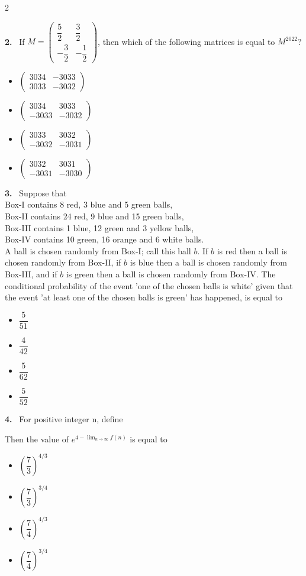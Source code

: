 \documentclass[10pt]{extarticle}
\newcommand{\qn}[1]{\par\smallskip\noindent\textbf{#1.}~}
\newenvironment{qoptions}{\begin{itemize}[leftmargin=1.8em,itemsep=1pt,topsep=2pt,label={}]}{\end{itemize}}
\newcommand{\opt}[2]{\item[(#1)] #2}
\begin{document}
\begin{multicols}{2}
\qn{2} If $M = \begin{pmatrix}\dfrac52 & \dfrac32\\ -\dfrac32 & -\dfrac12\end{pmatrix}$, then which of the following matrices is equal to $M^{2022}$?
\begin{qoptions}
\opt{A}{$\begin{pmatrix}3034 & -3033\\ 3033 & -3032\end{pmatrix}$}
\opt{B}{$\begin{pmatrix}3034 & 3033\\ -3033 & -3032\end{pmatrix}$}
\opt{C}{$\begin{pmatrix}3033 & 3032\\ -3032 & -3031\end{pmatrix}$}
\opt{D}{$\begin{pmatrix}3032 & 3031\\ -3031 & -3030\end{pmatrix}$}
\end{qoptions}

\qn{3} Suppose that\\
Box-I contains 8 red, 3 blue and 5 green balls,\\
Box-II contains 24 red, 9 blue and 15 green balls,\\
Box-III contains 1 blue, 12 green and 3 yellow balls,\\
Box-IV contains 10 green, 16 orange and 6 white balls.\\
A ball is chosen randomly from Box-I; call this ball $b$. If $b$ is red then a ball is chosen randomly from Box-II, if $b$ is blue then a ball is chosen randomly from Box-III, and if $b$ is green then a ball is chosen randomly from Box-IV. The conditional probability of the event 'one of the chosen balls is white' given that the event 'at least one of the chosen balls is green' has happened, is equal to
\begin{qoptions}
\opt{A}{$\dfrac{5}{51}$}
\opt{B}{$\dfrac{4}{42}$}
\opt{C}{$\dfrac{5}{62}$}
\opt{D}{$\dfrac{5}{52}$}
\end{qoptions}

\qn{4} For positive integer n, define\par\noindent
{}\par
Then the value of $\displaystyle e^{4-\lim_{n\to\infty}f(n)}$ is equal to
\begin{qoptions}
\opt{A}{$\left(\dfrac73\right)^{4/3}$}
\opt{B}{$\left(\dfrac73\right)^{3/4}$}
\opt{C}{$\left(\dfrac74\right)^{4/3}$}
\opt{D}{$\left(\dfrac74\right)^{3/4}$}
\end{qoptions}


\end{multicols}
\end{document}

